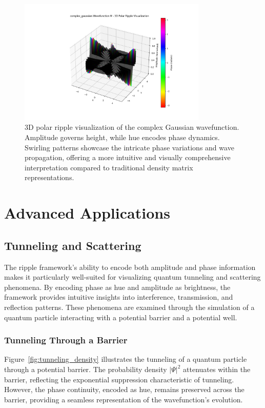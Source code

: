 \documentclass[12pt]{article}
\begin{document}
\begin{figure}[H]
\centering
\includegraphics[width=0.8\textwidth]{images/complex_gaussian_wavefunction_3d_polar_probability_density_with_phase.png}
\caption{3D polar ripple visualization of the complex Gaussian wavefunction. Amplitude governs height, while hue encodes phase dynamics. Swirling patterns showcase the intricate phase variations and wave propagation, offering a more intuitive and visually comprehensive interpretation compared to traditional density matrix representations.}
\label{fig:complex_gaussian_3d_polar}
\end{figure}

\section{Advanced Applications}
\label{sec:advanced_applications}

\subsection{Tunneling and Scattering}

The ripple framework’s ability to encode both amplitude and phase information makes it particularly well-suited for visualizing quantum tunneling and scattering phenomena. By encoding phase as hue and amplitude as brightness, the framework provides intuitive insights into interference, transmission, and reflection patterns. These phenomena are examined through the simulation of a quantum particle interacting with a potential barrier and a potential well.

\subsubsection{Tunneling Through a Barrier}

Figure~\ref{fig:tunneling_density} illustrates the tunneling of a quantum particle through a potential barrier. The probability density \(|\Psi|^2\) attenuates within the barrier, reflecting the exponential suppression characteristic of tunneling. However, the phase continuity, encoded as hue, remains preserved across the barrier, providing a seamless representation of the wavefunction's evolution.
\end{document}
